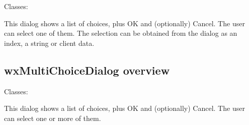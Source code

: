 Classes: 

This dialog shows a list of choices, plus OK and (optionally) Cancel. The user can
select one of them. The selection can be obtained from the dialog as an index,
a string or client data.

\subsection{wxMultiChoiceDialog overview}\label{wxmultichoicedialogoverview}

Classes: 

This dialog shows a list of choices, plus OK and (optionally) Cancel. The user can
select one or more of them.

